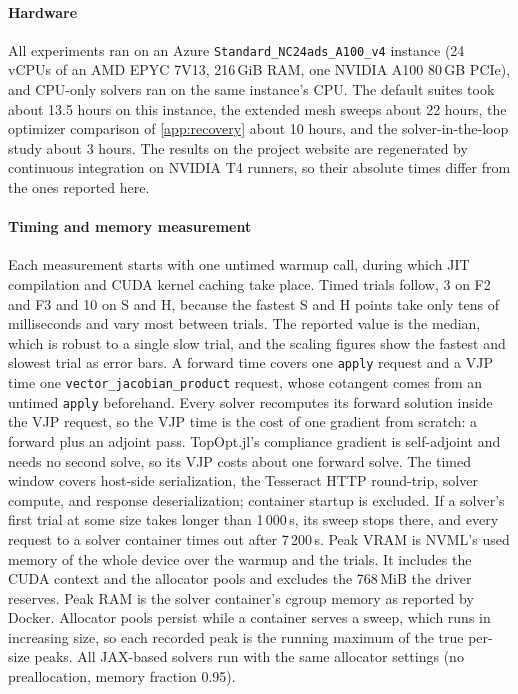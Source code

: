 \paragraph{Hardware}
All experiments ran on an Azure \texttt{Standard\_NC24ads\_A100\_v4} instance
(24 vCPUs of an AMD EPYC 7V13, 216\,GiB RAM, one NVIDIA A100 80\,GB PCIe), and
CPU-only solvers ran on the same instance's CPU.
The default suites took about 13.5 hours on this instance, the extended mesh
sweeps about 22 hours, the optimizer comparison of \cref{app:recovery} about
10 hours, and the solver-in-the-loop study about 3 hours.
The results on the project website are regenerated by continuous integration
on NVIDIA T4 runners, so their absolute times differ from the ones reported here.

\paragraph{Timing and memory measurement}
Each measurement starts with one untimed warmup call, during which JIT
compilation and CUDA kernel caching take place. Timed trials follow, 3 on F2 and F3 and 10 on S and H,
because the fastest S and H points take only tens of milliseconds and vary most
between trials. The reported value is
the median, which is robust to a single slow trial, and the scaling figures show the
fastest and slowest trial as error bars.
A forward time covers one \texttt{apply} request and a VJP time one
\texttt{vector\_jacobian\_product} request, whose cotangent comes from an untimed
\texttt{apply} beforehand. Every solver recomputes its forward solution inside the
VJP request, so the VJP time is the cost of one gradient from scratch: a forward
plus an adjoint pass. TopOpt.jl's compliance gradient is self-adjoint and needs no
second solve, so its VJP costs about one forward solve.
The timed window covers host-side serialization, the Tesseract HTTP round-trip, solver
compute, and response deserialization; container startup is excluded.
If a solver's first trial at some size takes longer than 1\,000\,s, its sweep stops there,
and every request to a solver container times out after 7\,200\,s.
Peak VRAM is NVML's used memory of the whole device over the warmup and the trials.
It includes the CUDA context and the allocator pools and excludes the 768\,MiB the
driver reserves. Peak RAM is the solver container's cgroup memory as reported by
Docker. Allocator pools persist while a container serves a sweep, which runs in
increasing size, so each recorded peak is the running maximum of the true per-size
peaks. All JAX-based solvers run with the same allocator settings (no preallocation,
memory fraction 0.95).

